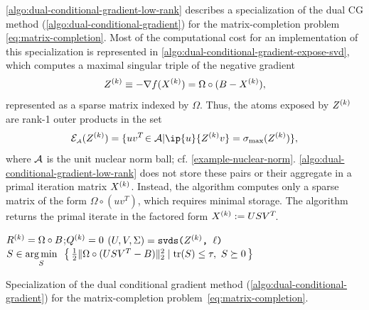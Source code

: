 \begin{example}
  \autoref{algo:dual-conditional-gradient-low-rank} describes a specialization of
  the dual CG method (\autoref{algo:dual-conditional-gradient}) for the
  matrix-completion problem \eqref{eq:matrix-completion}. Most of the
  computational cost for an implementation of this specialization is represented
  in \autoref{algo:dual-conditional-gradient-expose-svd}, which computes a
  maximal singular triple of the negative gradient
  \[
    Z^{(k)}\equiv-\nabla f(X^{(k)}) = \Omega\circ(B-X^{(k)}),
  \]
  represented as a sparse matrix indexed by $\Omega$.  Thus, the atoms exposed
  by $Z^{(k)}$ are rank-1 outer products in the set
  \[
    \Escr\As(Z\k) = \{uv\T\in\Ascr | \ip{u}{Z\k v}=\sigma\submax(Z\k) \},
  \] 
  where $\mathcal{A}$ is the unit nuclear norm ball; cf. \autoref{example-nuclear-norm}.
  \autoref{algo:dual-conditional-gradient-low-rank} does not store these pairs or
  their aggregate in a primal iteration matrix $X^{(k)}$. Instead, the algorithm
  computes only a sparse matrix of the form $\Omega\circ(u v^T)$, which requires
  minimal storage. The
  algorithm returns the primal iterate in the factored form $X^{(k)}:=USV^T\!$.
  \begin{algorithm}[t]
    \DontPrintSemicolon\setcounter{AlgoLine}{-1}
    $R^{(k)}=\Omega\circ B$;\enspace $Q^{(k)}=0$\;
    $(U, V, \Sigma) = \mbox{\tt svds($Z^{(k)}$, $\ell$)}$\label{algo:dual-conditional-gradient-low-rank-svd} 
    $S\in\underset{S}{\textrm{arg}\,{\min}}\enskip\left\{\,{\textstyle{\frac{1}{2}}}\|\Omega\circ(U SV^T-B)\|_2^2
      \mid \operatorname{tr}(S)\le\tau,\ S\succeq0\,\right\}$\label{cg-dual-recover-low-rank}\;
    \caption{Specialization of the dual conditional gradient method
    (\autoref{algo:dual-conditional-gradient}) for the
    matrix-completion problem~\eqref{eq:matrix-completion}.\label{algo:dual-conditional-gradient-low-rank}}
  \end{algorithm}


\end{example}
